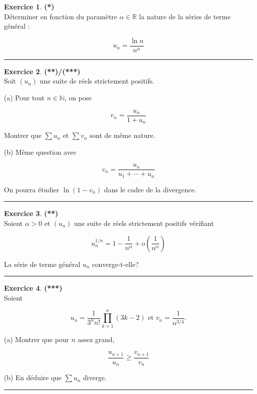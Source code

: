 \documentclass[a4paper,11pt]{article}
\theoremstyle{definition}
\newtheorem{exo}{Exercice} %
\begin{document}
\begin{exo}\textbf{(*)}\quad\\[0.25cm]%
	Déterminer en fonction du paramètre $\alpha \in \mathbb{R}$ la nature de la séries de terme général :

	$$u_{n}=\frac{\ln n}{n^{\alpha}}$$
	
	\centering
\rule{1\linewidth}{0.6pt}
\end{exo}

\begin{exo}\textbf{(**)/(***)}\quad\\[0.25cm]%
	Soit $\left(u_{n}\right)$ une suite de réels strictement positifs.
	
	(a) Pour tout $n \in \mathbb{N}$, on pose
	
	$$
	v_{n}=\frac{u_{n}}{1+u_{n}}
	$$
	
	Montrer que $\sum u_{n}$ et $\sum v_{n}$ sont de même nature.
	
	(b) Même question avec
	
	$$
	v_{n}=\frac{u_{n}}{u_{1}+\cdots+u_{n}}
	$$
	
	On pourra étudier $\ln \left(1-v_{n}\right)$ dans le cadre de la divergence. 
	
	\centering
	\rule{1\linewidth}{0.6pt}
\end{exo}


\begin{exo}\textbf{(**)}\quad\\[0.25cm]%
	Soient $\alpha>0$ et $\left(u_{n}\right)$ une suite de réels strictement positifs vérifiant
	
	$$
	u_{n}^{1 / n}=1-\frac{1}{n^{\alpha}}+\mathrm{o}\left(\frac{1}{n^{\alpha}}\right)
	$$
	
	La série de terme général $u_{n}$ converge-t-elle?
	
	\centering
	\rule{1\linewidth}{0.6pt}
\end{exo}

\begin{exo}\textbf{(***)}\quad\\[0.25cm]%
	Soient
	
	$$
	u_{n}=\frac{1}{3^{n} n !} \prod_{k=1}^{n}(3 k-2) \text { et } v_{n}=\frac{1}{n^{3 / 4}} .
	$$
	
	(a) Montrer que pour $n$ assez grand,
	
	$$
	\frac{u_{n+1}}{u_{n}} \geq \frac{v_{n+1}}{v_{n}}
	$$
	
	(b) En déduire que $\sum u_{n}$ diverge.
	
	
	\centering
	\rule{1\linewidth}{0.6pt}
\end{exo}
\end{document}
